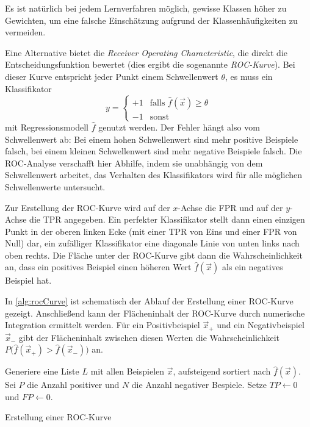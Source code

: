 			Es ist natürlich bei jedem Lernverfahren möglich, gewisse Klassen höher zu Gewichten, um eine falsche Einschätzung aufgrund der Klassenhäufigkeiten zu vermeiden.

			Eine Alternative bietet die \emph{Receiver Operating Characteristic}, die direkt die Entscheidungsfunktion bewertet (dies ergibt die sogenannte \emph{ROC-Kurve}). Bei dieser Kurve entspricht jeder Punkt einem Schwellenwert \(\theta\), \dh es muss ein Klassifikator
			\begin{equation}
				y =
					\begin{cases}
						+1 & \text{falls } \hat{f}(\vec{x}) \geq \theta \\
						-1 & \text{sonst}
					\end{cases}
			\end{equation}
			mit Regressionsmodell \(\hat{f}\) genutzt werden. Der Fehler hängt also vom Schwellenwert ab: Bei einem hohen Schwellenwert sind mehr positive Beispiele falsch, bei einem kleinen Schwellenwert sind mehr negative Beispiele falsch. Die ROC-Analyse verschafft hier Abhilfe, indem sie unabhängig von dem Schwellenwert arbeitet, \dh das Verhalten des Klassifikators wird für alle möglichen Schwellenwerte untersucht.

			Zur Erstellung der ROC-Kurve wird auf der \(x\)-Achse die FPR und auf der \(y\)-Achse die TPR angegeben. Ein perfekter Klassifikator stellt dann einen einzigen Punkt in der oberen linken Ecke (mit einer TPR von Eins und einer FPR von Null) dar, ein zufälliger Klassifikator eine diagonale Linie von unten links nach oben rechts. Die Fläche unter der ROC-Kurve gibt dann die Wahrscheinlichkeit an, dass ein positives Beispiel einen höheren Wert \(\hat{f}(\vec{x})\) als ein negatives Beispiel hat.

			In \autoref{alg:rocCurve} ist schematisch der Ablauf der Erstellung einer ROC-Kurve gezeigt. Anschließend kann der Flächeninhalt der ROC-Kurve durch numerische Integration ermittelt werden. Für ein Positivbeispiel \( \vec{x}_+ \) und ein Negativbeispiel \( \vec{x}_- \) gibt der Flächeninhalt zwischen diesen Werten die Wahrscheinlichkeit \( P\big( \hat{f}(\vec{x}_+) > \hat{f}(\vec{x}_-) \big) \) an.

			\begin{algorithm}
				Generiere eine Liste \(L\) mit allen Beispielen \(\vec{x}\), aufsteigend sortiert nach \( \hat{f}(\vec{x}) \). \;
				Sei \(P\) die Anzahl positiver und \(N\) die Anzahl negativer Bespiele. \;
				Setze \( \mathit{TP} \gets 0 \) und \( \mathit{FP} \gets 0 \). \;
				\caption{Erstellung einer ROC-Kurve}
				\label{alg:rocCurve}
			\end{algorithm}

